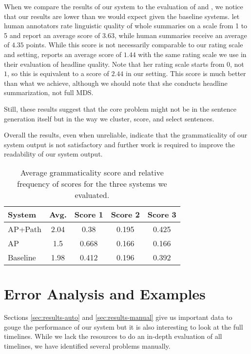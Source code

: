 \documentclass[a4paper,BCOR=10mm]{report}
\numberwithin{lemma}{chapter}
\numberwithin{definition}{chapter}
\begin{document}
When we compare the results of our system to the evaluation of \citet{banerjee} and \citet{filippova}, we notice that our results are lower than we would expect given the baseline systems. \citet{banerjee} let human annotators rate linguistic quality of whole summaries on a scale from 1 to 5 and report an average score of $3.63$, while human summaries receive an average of $4.35$ points.
While this score is not necessarily comparable to our rating scale and setting, \citet{filippova} reports an average score of $1.44$ with the same rating scale we use in their evaluation of headline quality. Note that her rating scale starts from $0$, not $1$, so this is equivalent to a score of $2.44$ in our setting. This score is much better than what we achieve, although we should note that she conducts headline summarization, not full MDS.

Still, these results suggest that the core problem might not be in the sentence generation itself but in the way we cluster, score, and select sentences.

Overall the results, even when unreliable, indicate that the grammaticality of our system output is not satisfactory and further work is required to improve the readability of our system output.

\begin{table}

\centering\begin{tabular}{|l|c|ccc|}
\hline
\textbf{System} & \textbf{Avg.} & \textbf{Score 1} & \textbf{Score 2} & \textbf{Score 3} \\\hline
AP+Path &  2.04 & 0.38 & 0.195 & 0.425 \\
AP & 1.5 & 0.668 & 0.166 & 0.166 \\
Baseline & 1.98 & 0.412 & 0.196 & 0.392 \\\hline
\end{tabular}


\caption{Average grammaticality score and relative frequency of scores for the three systems we evaluated.}
\label{tab:results-manual}
\end{table}

\chapter{Error Analysis and Examples}  \label{sec:errors}

Sections \ref{sec:results-auto} and \ref{sec:results-manual} give us important data to gouge the performance of our system but it is also interesting to look at the full timelines.
While we lack the resources to do an in-depth evaluation of all timelines, we have identified several problems manually.
\end{document}
